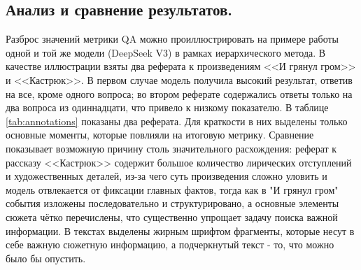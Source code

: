 \documentclass{article}
\begin{document}
\subsection*{Анализ и сравнение результатов.}
Разброс значений метрики QA можно проиллюстрировать на примере работы одной и той же модели (DeepSeek V3) в рамках иерархического метода.
В качестве иллюстрации взяты два реферата к произведениям <<И грянул гром>> и <<Кастрюк>>. 
В первом случае модель получила высокий результат, ответив на все, кроме одного вопроса; во втором
реферате содержались ответы только на два вопроса из одиннадцати, что привело к низкому показателю. В таблице \ref{tab:annotations} показаны два реферата. 
Для краткости в них выделены только основные моменты, которые
повлияли на итоговую метрику. 
Сравнение показывает возможную причину столь значительного расхождения: реферат к рассказу <<Кастрюк>> содержит большое количество лирических отступлений и художественных деталей,
из-за чего суть произведения сложно уловить и модель отвлекается от фиксации главных фактов,
тогда как в "И грянул гром" события изложены последовательно и структурировано, 
а основные элементы сюжета чётко перечислены, что существенно упрощает задачу поиска важной информации.
В текстах выделены жирным шрифтом фрагменты, которые несут в себе важную сюжетную информацию, а подчеркнутый текст - то, что можно было бы опустить.
\end{document}
